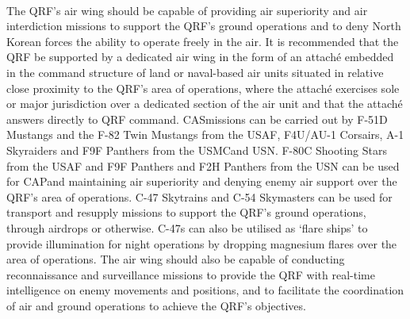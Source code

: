 \documentclass[a4paper,12pt]{article}
\begin{document}
{	\\
	The QRF's air wing should be capable of providing air superiority and air interdiction missions to support the QRF's ground operations and to deny North Korean forces the ability to operate freely in the air. It is recommended that the QRF be supported by a dedicated air wing in the form of an attaché embedded in the command structure of land or naval-based air units situated in relative close proximity to the QRF's area of operations, where the attaché exercises sole or major jurisdiction over a dedicated section of the air unit and that the attaché answers directly to QRF command. CAS\footnotemark[3] missions can be carried out by F-51D Mustangs and the F-82 Twin Mustangs from the USAF\footnotemark[4], F4U/AU-1 Corsairs, A-1 Skyraiders and F9F Panthers from the USMC\footnotemark[5] and USN\footnotemark[6]. F-80C Shooting Stars from the USAF and F9F Panthers and F2H Panthers from the USN can be used for CAP\footnotemark[7] and maintaining air superiority and denying enemy air support over the QRF's area of operations. C-47 Skytrains and C-54 Skymasters can be used for transport and resupply missions to support the QRF's ground operations, through airdrops or otherwise. C-47s can also be utilised as `flare ships' to provide illumination for night operations by dropping magnesium flares over the area of operations.
	 The air wing should also be capable of conducting reconnaissance and surveillance missions to provide the QRF with real-time intelligence on enemy movements and positions, and to facilitate the coordination of air and ground operations to achieve the QRF's objectives.
}


\newpage

\printbibliography
\end{document}
